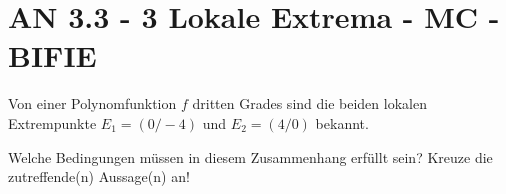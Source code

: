\section{AN 3.3 - 3 Lokale Extrema - MC - BIFIE}

\begin{beispiel}[AN 3.3]{1} %
				Von einer Polynomfunktion $f$ dritten Grades sind die beiden lokalen Extrempunkte $E_1=(0/-4)$ und $E_2=(4/0)$ bekannt.

Welche Bedingungen müssen in diesem Zusammenhang erfüllt sein? Kreuze die zutreffende(n) Aussage(n) an!

\end{beispiel}